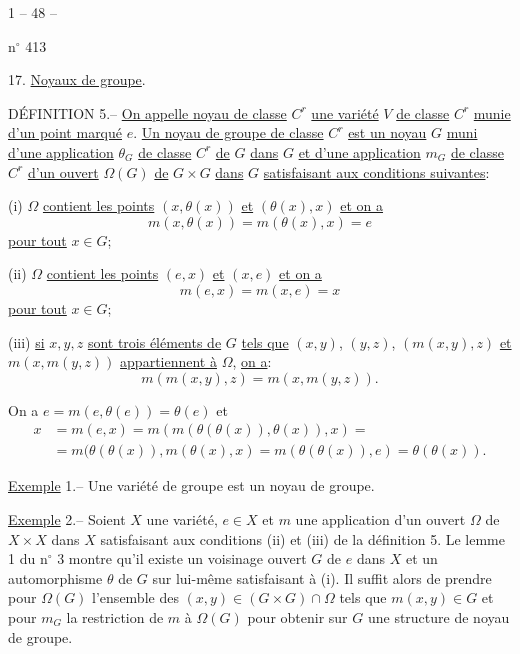 \begin{center}1 -- 48 --\end{center}\hfill n$^\circ$ 413

17. \uline{Noyaux de groupe}.

DÉFINITION 5.-- \uline{On appelle noyau de classe} $C^r$ \uline{une variété} $V$ \uline{de classe} $C^r$ \uline{munie d'un point marqué} $e$.
\uline{Un noyau de groupe de classe} $C^r$ \uline{est un noyau} $G$ \uline{muni d'une application} $\theta_G$ \uline{de classe} $C^r$ \uline{de} $G$ \uline{dans} $G$ \uline{et d'une application} $m_G$ \uline{de classe} $C^r$ \uline{d'un ouvert} $\Omega(G)$ \uline{de} $G\times G$ \uline{dans} $G$ \uline{satisfaisant aux conditions suivantes}:

(i) $\Omega$ \uline{contient les points} $(x,\theta(x))$ \uline{et} $(\theta(x),x)$ \uline{et on a}
\[
\tag{36}m(x,\theta(x))=m(\theta(x),x)=e
\]
\uline{pour tout} $x\in G$;

(ii) $\Omega$ \uline{contient les points} $(e,x)$ \uline{et} $(x,e)$ \uline{et on a}
\[
\tag{37}m(e,x)=m(x,e)=x
\]
\uline{pour tout} $x\in G$;

(iii) \uline{si} $x,y,z$ \uline{sont trois éléments de} $G$ \uline{tels que} $(x,y)$, $(y,z)$, $(m(x,y),z)$ \uline{et} $m(x,m(y,z))$ \uline{appartiennent à} $\Omega$, \uline{on a}:
\[
\tag{38}m(m(x,y),z)=m(x,m(y,z)).
\]

On a $e=m(e,\theta(e))=\theta(e)$ et
\[
\begin{aligned}
x&=m(e,x)=m(m(\theta(\theta(x)),\theta(x)),x)=\\
&=m(\theta(\theta(x)),m(\theta(x),x)=m(\theta(\theta(x)),e)=\theta(\theta(x)).
\end{aligned}
\]

\uline{Exemple} 1.-- Une variété de groupe est un noyau de groupe.

\uline{Exemple} 2.-- Soient $X$ une variété, $e\in X$ et $m$ une application d'un ouvert $\Omega$ de $X\times X$ dans $X$ satisfaisant aux conditions (ii) et (iii) de la définition 5.
Le lemme 1 du n$^\circ$ 3 montre qu'il existe un voisinage ouvert $G$ de $e$ dans $X$ et un automorphisme $\theta$ de $G$ sur lui-même satisfaisant à (i).
Il suffit alors de prendre pour $\Omega(G)$ l'ensemble des $(x,y)\in(G\times G)\cap\Omega$ tels que $m(x,y)\in G$ et pour $m_G$ la restriction de $m$ à $\Omega(G)$ pour obtenir sur $G$ une structure de noyau de groupe.

